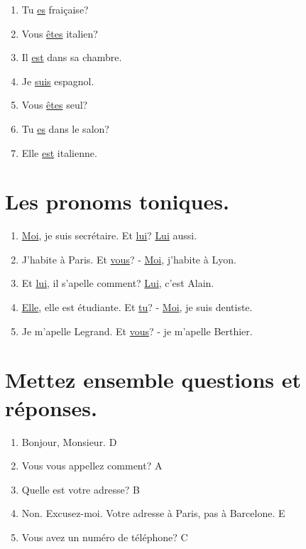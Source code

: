\begin{enumerate}
    \item Tu \underline{es} fraiçaise?
    \item Vous \underline{êtes} italien?
    \item Il \underline{est} dans sa chambre.
    \item Je \underline{suis} espagnol. 
    \item Vous \underline{êtes} seul?
    \item Tu \underline{es} dans le salon?
    \item Elle \underline{est} italienne.
\end{enumerate}

\section{Les pronoms toniques.}

\begin{enumerate}
    \item \underline{Moi}, je suis secrétaire. Et \underline{lui}? \underline{Lui} aussi.
    \item J'habite à Paris. Et \underline{vous}? - \underline{Moi}, j'habite à Lyon.
    \item Et \underline{lui}, il s'apelle comment? \underline{Lui}, c'est Alain.
    \item \underline{Elle}, elle est étudiante. Et \underline{tu}? - \underline{Moi}, je suis dentiste.
    \item Je m'apelle Legrand. Et \underline{vous}? - je m'apelle Berthier.
\end{enumerate}

\section{Mettez ensemble questions et réponses.}

\begin{enumerate}
    \item Bonjour, Monsieur. \rar D
    \item Vous vous appellez comment? \rar A
    \item Quelle est votre adresse? \rar B
    \item Non. Excusez-moi. Votre adresse à Paris, pas à Barcelone. \rar E
    \item Vous avez un numéro de téléphone? \rar C
\end{enumerate}

